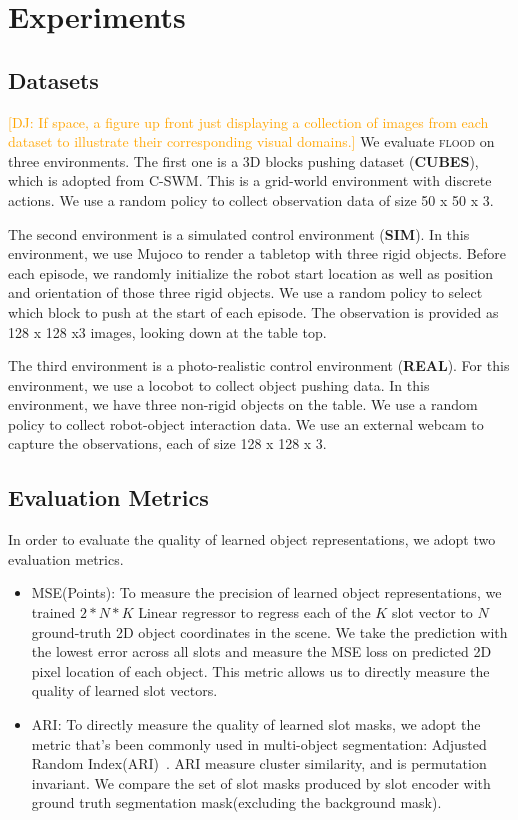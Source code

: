 \documentclass{article}
\newcommand{\jd}[1]{\textcolor{orange}{[DJ: #1]}}
\begin{document}
\section{Experiments}
\label{sec:experiments}

 

\subsection{Datasets}
\jd{If space, a figure up front just displaying a collection of images from each dataset to illustrate their corresponding visual domains.}
We evaluate \textsc{flood} on three environments. The first one is a 3D blocks pushing dataset (\textbf{CUBES}), which is adopted from C-SWM. This is a grid-world environment with discrete actions. We use a random policy to collect observation data of size 50 x 50 x 3. 

The second environment is a simulated control environment (\textbf{SIM}). In this environment, we use Mujoco to render a tabletop with three rigid objects. Before each episode, we randomly initialize the robot start location as well as position and orientation of those three rigid objects. We use a random policy to select which block to push at the start of each episode.  The observation is provided as 128 x 128 x3 images, looking down at the table top.

The third environment is a photo-realistic control environment (\textbf{REAL}). For this environment, we use a locobot to collect object pushing data. In this environment, we have three non-rigid objects on the table. We use a random policy to collect robot-object interaction data. We use an external webcam to capture the observations, each of size 128 x 128 x 3.

\subsection{Evaluation Metrics}
In order to evaluate the quality of learned object representations, we adopt two evaluation metrics. 
\begin{itemize}
    \item MSE(Points): To measure the precision of learned object representations, we trained $2*N*K$ Linear regressor to regress each of the $K$ slot vector to $N$ ground-truth 2D object coordinates in the scene. We take the prediction with the lowest error across all slots and measure the MSE loss on predicted 2D pixel location of each object. This metric allows us to directly measure the quality of learned slot vectors.
    \item ARI: To directly measure the quality of learned slot masks, we adopt the metric that's been commonly used in multi-object segmentation: Adjusted Random Index(ARI)~\cite{ari1,ari2}. ARI measure cluster similarity, and is permutation invariant. We compare the set of slot masks produced by slot encoder with ground truth segmentation mask(excluding the background mask).
\end{itemize}
\end{document}

